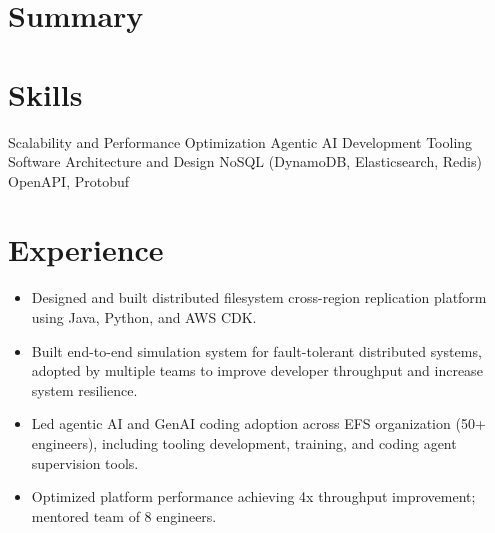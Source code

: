 \documentclass[11pt,a4paper,sans]{moderncv}
\begin{document}
\pagestyle{empty}
\maketitle

\section{\textbf{Summary}}



\section{\textbf{Skills}}


                       {Scalability and Performance Optimization}
                       {Agentic AI Development Tooling}
                       {Software Architecture and Design}
                       {NoSQL (DynamoDB, Elasticsearch, Redis)}
                       {OpenAPI, Protobuf}





\section{\textbf{Experience}}

{ \begin{itemize} \itemsep -2pt
  \item Designed and built distributed filesystem cross-region replication platform using Java, Python, and AWS CDK.
  \item Built end-to-end simulation system for fault-tolerant distributed systems, adopted by multiple teams to improve developer throughput and increase system resilience.
  \item Led agentic AI and GenAI coding adoption across EFS organization (50+ engineers), including tooling development, training, and coding agent supervision tools.
  \item Optimized platform performance achieving 4x throughput improvement; mentored team of 8 engineers.
 \end{itemize} }
\end{document}
